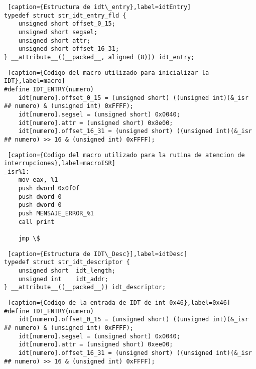 \begin{lstlisting} [caption={Estructura de idt\_entry},label=idtEntry]
typedef struct str_idt_entry_fld {
    unsigned short offset_0_15;
    unsigned short segsel;
    unsigned short attr;
    unsigned short offset_16_31;
} __attribute__((__packed__, aligned (8))) idt_entry;

\end{lstlisting}


\begin{lstlisting} [caption={Codigo del macro utilizado para inicializar la IDT},label=macro]
#define IDT_ENTRY(numero)                                                                                        
    idt[numero].offset_0_15 = (unsigned short) ((unsigned int)(&_isr ## numero) & (unsigned int) 0xFFFF);        
    idt[numero].segsel = (unsigned short) 0x0040;                                                                
    idt[numero].attr = (unsigned short) 0x8e00;                                                                  
    idt[numero].offset_16_31 = (unsigned short) ((unsigned int)(&_isr ## numero) >> 16 & (unsigned int) 0xFFFF);
\end{lstlisting}

\begin{lstlisting} [caption={Codigo del macro utilizado para la rutina de atencion de interrupciones},label=macroISR]
_isr%1:
    mov eax, %1
    push dword 0x0f0f 
    push dword 0
    push dword 0
    push MENSAJE_ERROR_%1
    call print
    
    jmp \$
\end{lstlisting}

\begin{lstlisting} [caption={Estructura de IDT\_Desc}],label=idtDesc] 
typedef struct str_idt_descriptor {
    unsigned short  idt_length;
    unsigned int    idt_addr;
} __attribute__((__packed__)) idt_descriptor;
\end{lstlisting}

\begin{lstlisting} [caption={Codigo de la entrada de IDT de int 0x46},label=0x46]
#define IDT_ENTRY(numero)                                                                                        
    idt[numero].offset_0_15 = (unsigned short) ((unsigned int)(&_isr ## numero) & (unsigned int) 0xFFFF);        
    idt[numero].segsel = (unsigned short) 0x0040;                                                                
    idt[numero].attr = (unsigned short) 0xee00;                                                                  
    idt[numero].offset_16_31 = (unsigned short) ((unsigned int)(&_isr ## numero) >> 16 & (unsigned int) 0xFFFF);
\end{lstlisting}


